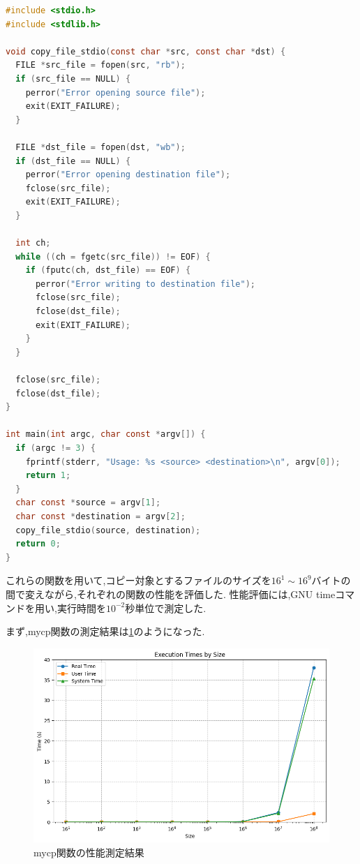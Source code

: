 \documentclass[autodetect-engine, dvi=dvipdfmx, 10pt, a4paper, ja=standard]{bxjsarticle}
\begin{document}
\begin{lstlisting}[language={C}, caption={比較用のコピー関数のソースコード}, label={code:ex-2}]
#include <stdio.h>
#include <stdlib.h>

void copy_file_stdio(const char *src, const char *dst) {
  FILE *src_file = fopen(src, "rb");
  if (src_file == NULL) {
    perror("Error opening source file");
    exit(EXIT_FAILURE);
  }

  FILE *dst_file = fopen(dst, "wb");
  if (dst_file == NULL) {
    perror("Error opening destination file");
    fclose(src_file);
    exit(EXIT_FAILURE);
  }

  int ch;
  while ((ch = fgetc(src_file)) != EOF) {
    if (fputc(ch, dst_file) == EOF) {
      perror("Error writing to destination file");
      fclose(src_file);
      fclose(dst_file);
      exit(EXIT_FAILURE);
    }
  }

  fclose(src_file);
  fclose(dst_file);
}

int main(int argc, char const *argv[]) {
  if (argc != 3) {
    fprintf(stderr, "Usage: %s <source> <destination>\n", argv[0]);
    return 1;
  }
  char const *source = argv[1];
  char const *destination = argv[2];
  copy_file_stdio(source, destination);
  return 0;
}

\end{lstlisting}

これらの関数を用いて,コピー対象とするファイルのサイズを$16^1 \sim 16^9$バイトの間で変えながら,それぞれの関数の性能を評価した.
性能評価には,GNU timeコマンドを用い,実行時間を$10^{-2}$秒単位で測定した.

まず,mycp関数の測定結果は\ref{fig:ex-1-mycp}のようになった.

\begin{figure}[H]
	\centering
	\includegraphics[width=0.8\linewidth]{./mycp.png}
	\caption{mycp関数の性能測定結果}
	\label{fig:ex-1-mycp}
\end{figure}
\end{document}
